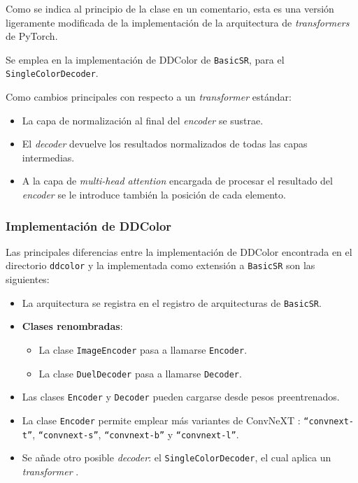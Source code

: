 \documentclass[a4paper]{article}
\begin{document}
Como se indica al principio de la clase en un comentario, esta es una versión ligeramente modificada de la implementación de la arquitectura de \textit{transformers} \cite{Attention} de PyTorch.

Se emplea en la implementación de DDColor de \texttt{BasicSR}, para el \texttt{SingleColorDecoder}.

Como cambios principales con respecto a un \textit{transformer} estándar:

\begin{itemize}
  \item{La capa de normalización al final del \textit{encoder} se sustrae.}
  \item{El \textit{decoder} devuelve los resultados normalizados de todas las capas intermedias.}
  \item{A la capa de \textit{multi-head attention} encargada de procesar el resultado del \textit{encoder} se le introduce también la posición de cada elemento.}
\end{itemize}

\subsubsection{Implementación de DDColor}

Las principales diferencias entre la implementación de DDColor encontrada en el directorio \texttt{ddcolor} y la implementada como extensión a \texttt{BasicSR} son las siguientes:

\begin{itemize}
  \item{La arquitectura se registra en el registro de arquitecturas de \texttt{BasicSR}.}
  \item{\textbf{Clases renombradas}:
    \begin{itemize}
      \item{La clase \texttt{ImageEncoder} pasa a llamarse \texttt{Encoder}.}
      \item{La clase \texttt{DuelDecoder} pasa a llamarse \texttt{Decoder}.}
    \end{itemize}
  }
  \item{Las clases \texttt{Encoder} y \texttt{Decoder} pueden cargarse desde pesos preentrenados.}
  \item{La clase \texttt{Encoder} permite emplear más variantes de ConvNeXT \cite{ConvNeXT}: \texttt{``convnext-t''}, \texttt{``convnext-s''}, \texttt{``convnext-b''} y \texttt{``convnext-l''}.}
  \item{Se añade otro posible \textit{decoder}: el \texttt{SingleColorDecoder}, el cual aplica un \textit{transformer} \cite{Attention}.}
\end{itemize}
\end{document}
